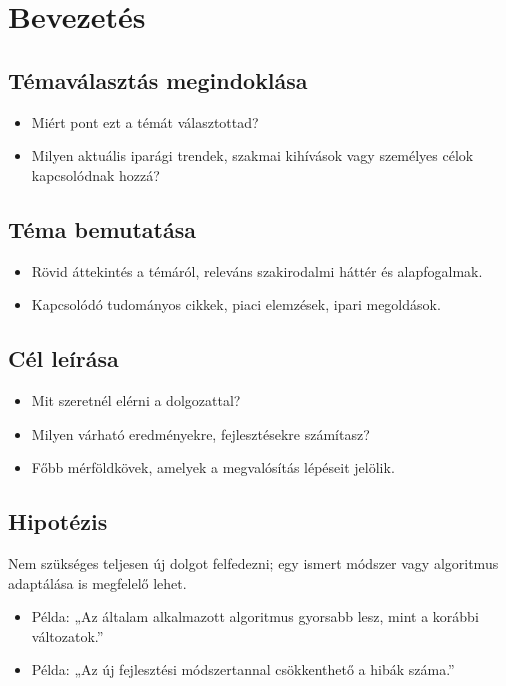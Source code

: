 \documentclass{thesis-ekf}
\begin{document}
\chapter{Bevezetés}

\section{Témaválasztás megindoklása}
\begin{itemize}
  \item Miért pont ezt a témát választottad?
  \item Milyen aktuális iparági trendek, szakmai kihívások vagy személyes célok kapcsolódnak hozzá?
\end{itemize}

\section{Téma bemutatása}
\begin{itemize}
  \item Rövid áttekintés a témáról, releváns szakirodalmi háttér és alapfogalmak.
  \item Kapcsolódó tudományos cikkek, piaci elemzések, ipari megoldások.
\end{itemize}

\section{Cél leírása}
\begin{itemize}
  \item Mit szeretnél elérni a dolgozattal?
  \item Milyen várható eredményekre, fejlesztésekre számítasz?
  \item Főbb mérföldkövek, amelyek a megvalósítás lépéseit jelölik.
\end{itemize}

\section{Hipotézis}
Nem szükséges teljesen új dolgot felfedezni; egy ismert módszer vagy algoritmus adaptálása is megfelelő lehet.
\begin{itemize}
  \item Példa: „Az általam alkalmazott algoritmus gyorsabb lesz, mint a korábbi változatok.''
  \item Példa: „Az új fejlesztési módszertannal csökkenthető a hibák száma.''
\end{itemize}
\end{document}
